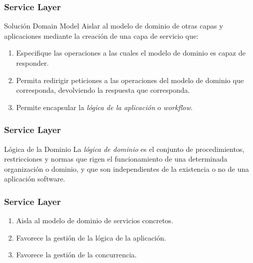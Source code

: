\documentclass[a4paper,slidestop,xcolor=pst,dvips,blue]{beamer}
\begin{document}
\begin{frame}[c]
    \frametitle{Service Layer}
    \begin{block}{Solución Domain Model}
        Aislar al modelo de dominio de otras capas y aplicaciones mediante la creación de una capa de servicio que:
        \begin{enumerate}
            \item Especifique las operaciones a las cuales el modelo de dominio es capaz de responder.
            \item Permita redirigir peticiones a las operaciones del modelo de dominio que corresponda, devolviendo la respuesta que corresponda.
            \item Permite encapsular la \emph{lógica de la aplicación} o \emph{workflow}.
        \end{enumerate}
    \end{block}
\end{frame}

\begin{frame}[c]
    \frametitle{Service Layer}
    \begin{block}{Lógica de la Dominio}
        La \emph{lógica de dominio} es el conjunto de procedimientos, restricciones y normas que rigen el funcionamiento de una determinada organización o dominio, y que son independientes de la existencia o no de una aplicación software.
    \end{block}
\end{frame}

\begin{frame}[c]
    \frametitle{Service Layer}
    \begin{enumerate}
        \item<1-> Aisla al modelo de dominio de servicios concretos.
        \item<2-> Favorece la gestión de la lógica de la aplicación.
        \item<3-> Favorece la gestión de la concurrencia.
    \end{enumerate}
\end{frame}
\end{document}
